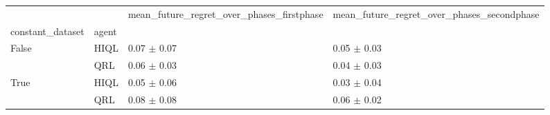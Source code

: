 \begin{tabular}{llll}
\toprule
 &  & mean_future_regret_over_phases_firstphase & mean_future_regret_over_phases_secondphase \\
constant_dataset & agent &  &  \\
\midrule
\multirow[t]{2}{*}{False} & HIQL & 0.07 $\pm$ 0.07 & 0.05 $\pm$ 0.03 \\
 & QRL & 0.06 $\pm$ 0.03 & 0.04 $\pm$ 0.03 \\
\cline{1-4}
\multirow[t]{2}{*}{True} & HIQL & 0.05 $\pm$ 0.06 & 0.03 $\pm$ 0.04 \\
 & QRL & 0.08 $\pm$ 0.08 & 0.06 $\pm$ 0.02 \\
\cline{1-4}
\bottomrule
\end{tabular}
